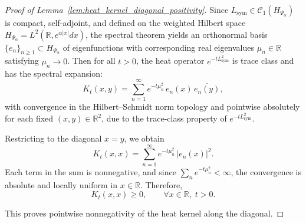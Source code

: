 \begin{proof}[Proof of Lemma~\ref{lem:heat_kernel_diagonal_positivity}]
Since \( L_{\mathrm{sym}} \in \mathcal{C}_1(H_{\Psi_\alpha}) \) is compact, self-adjoint, and defined on the weighted Hilbert space \( H_{\Psi_\alpha} = L^2(\mathbb{R}, e^{\alpha|x|} dx) \), the spectral theorem yields an orthonormal basis \( \{e_n\}_{n \geq 1} \subset H_{\Psi_\alpha} \) of eigenfunctions with corresponding real eigenvalues \( \mu_n \in \mathbb{R} \) satisfying \( \mu_n \to 0 \). Then for all \( t > 0 \), the heat operator \( e^{-t L_{\mathrm{sym}}^2} \) is trace class and has the spectral expansion:
\[
K_t(x,y) = \sum_{n=1}^\infty e^{-t \mu_n^2} \, e_n(x) \, \overline{e_n(y)},
\]
with convergence in the Hilbert–Schmidt norm topology and pointwise absolutely for each fixed \( (x,y) \in \mathbb{R}^2 \), due to the trace-class property of \( e^{-t L_{\mathrm{sym}}^2} \).

Restricting to the diagonal \( x = y \), we obtain
\[
K_t(x,x) = \sum_{n=1}^\infty e^{-t \mu_n^2} \, |e_n(x)|^2.
\]
Each term in the sum is nonnegative, and since \( \sum_{n} e^{-t \mu_n^2} < \infty \), the convergence is absolute and locally uniform in \( x \in \mathbb{R} \). Therefore,
\[
K_t(x,x) \geq 0, \qquad \forall x \in \mathbb{R}, \; t > 0.
\]

This proves pointwise nonnegativity of the heat kernel along the diagonal.
\end{proof}
